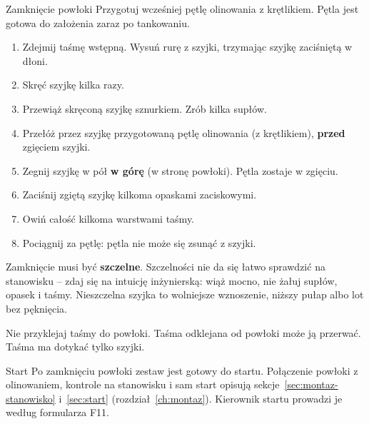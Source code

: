 \begin{sekcja}{Zamknięcie powłoki}\label{sec:szyjka}
Przygotuj wcześniej pętlę olinowania z krętlikiem. Pętla jest gotowa do założenia zaraz po tankowaniu.
\begin{enumerate}
  \item Zdejmij taśmę wstępną. Wysuń rurę z szyjki, trzymając szyjkę zaciśniętą w dłoni.
  \item Skręć szyjkę kilka razy.
  \item Przewiąż skręconą szyjkę sznurkiem. Zrób kilka supłów.
  \item Przełóż przez szyjkę przygotowaną pętlę olinowania (z krętlikiem), \textbf{przed} zgięciem szyjki.
  \item Zegnij szyjkę w pół \textbf{w górę} (w stronę powłoki). Pętla zostaje w zgięciu.
  \item Zaciśnij zgiętą szyjkę kilkoma opaskami zaciskowymi.
  \item Owiń całość kilkoma warstwami taśmy.
  \item Pociągnij za pętlę: pętla nie może się zsunąć z szyjki.
\end{enumerate}

Zamknięcie musi być \textbf{szczelne}. Szczelności nie da się łatwo sprawdzić na stanowisku -- zdaj się na intuicję inżynierską: wiąż mocno, nie żałuj supłów, opasek i taśmy. Nieszczelna szyjka to wolniejsze wznoszenie, niższy pułap albo lot bez pęknięcia.

\begin{uwaga}Nie przyklejaj taśmy do powłoki. Taśma odklejana od powłoki może ją przerwać. Taśma ma dotykać tylko szyjki.\end{uwaga}
\end{sekcja}

\begin{sekcja}{Start}
Po zamknięciu powłoki zestaw jest gotowy do startu. Połączenie powłoki z olinowaniem, kontrole na stanowisku i sam start opisują sekcje~\ref{sec:montaz-stanowisko} i~\ref{sec:start} (rozdział~\ref{ch:montaz}). Kierownik startu prowadzi je według formularza F11.
\end{sekcja}

